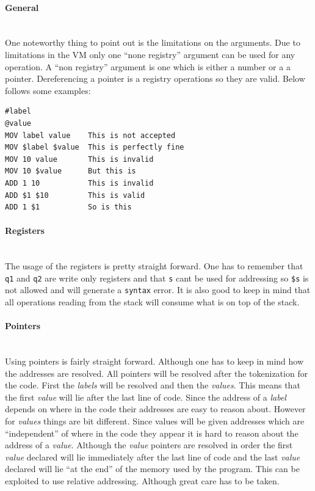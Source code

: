 \documentclass{article}
\newcommand{\V}{\verb}
\begin{document}
\paragraph{General} \
\\
One noteworthy thing to point out is the limitations on the arguments. Due to
limitations in the VM only one ``none registry'' argument can be used for any
operation. A ``non registry'' argument is one which is either a number or a
a pointer. Dereferencing a pointer is a registry operations so they are valid.
Below follows some examples:
\begin{verbatim}
#label
@value
MOV label value    This is not accepted
MOV $label $value  This is perfectly fine
MOV 10 value       This is invalid
MOV 10 $value      But this is
ADD 1 10           This is invalid
ADD $1 $10         This is valid
ADD 1 $1           So is this
\end{verbatim}

\paragraph{Registers} \
\\
The usage of the registers is pretty straight forward. One has to remember that
\V+q1+ and \V+q2+ are write only registers and that \V+s+ cant be used for
addressing so \verb+$s+ is not allowed and will generate a \verb+syntax+ error.
It is also good to keep in mind that all operations reading from the stack will
consume what is on top of the stack.

\paragraph{Pointers} \
\\
Using pointers is fairly straight forward. Although one has to keep in mind how
the addresses are resolved. All pointers will be resolved after the
tokenization for the code. First the \emph{labels} will be resolved and then the
\emph{values}.
This means that the first \emph{value} will lie after the last line of code. Since the
address of a \emph{label} depends on where in the code their addresses are easy to
reason about. However for \emph{values} things are bit different. Since values
will be given addresses which are ``independent'' of where in the code they appear it is
hard to reason about the address of a \emph{value}. Although the \emph{value} pointers are
resolved in order the first \emph{value} declared will lie immediately after the
last line of code and the last \emph{value} declared will lie ``at the end'' of the
memory used by the program. This can be exploited to use relative addressing.
Although great care has to be taken.
\end{document}
